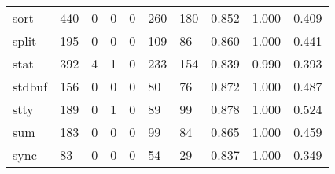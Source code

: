 \begin{longtable}{lp{2.0cm}p{2.0cm}p{2.0cm}p{2.0cm}p{2.0cm}p{2.0cm}p{2.0cm}p{2.0cm}p{2.0cm}}
sort      &                    440 &                                             0 &                                            0 &                                           0 &                                          260 &                                        180 &                                0.852 &                                  1.000 &                                0.409 \\
split     &                    195 &                                             0 &                                            0 &                                           0 &                                          109 &                                         86 &                                0.860 &                                  1.000 &                                0.441 \\
stat      &                    392 &                                             4 &                                            1 &                                           0 &                                          233 &                                        154 &                                0.839 &                                  0.990 &                                0.393 \\
stdbuf    &                    156 &                                             0 &                                            0 &                                           0 &                                           80 &                                         76 &                                0.872 &                                  1.000 &                                0.487 \\
stty      &                    189 &                                             0 &                                            1 &                                           0 &                                           89 &                                         99 &                                0.878 &                                  1.000 &                                0.524 \\
sum       &                    183 &                                             0 &                                            0 &                                           0 &                                           99 &                                         84 &                                0.865 &                                  1.000 &                                0.459 \\
sync      &                     83 &                                             0 &                                            0 &                                           0 &                                           54 &                                         29 &                                0.837 &                                  1.000 &                                0.349 \\

\end{longtable}
